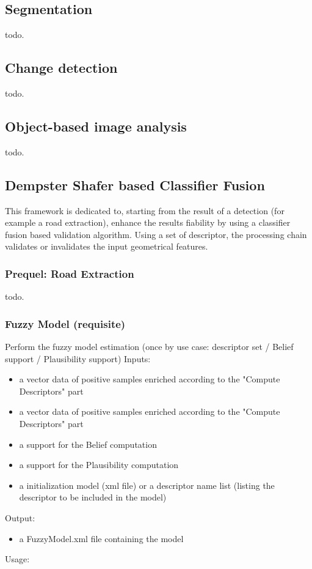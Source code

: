 \subsection{Segmentation}\label{ssec:segmentation}

todo.

\subsection{Change detection}\label{ssec:changedetection}

todo.

\subsection{Object-based image analysis}\label{ssec:obia}

todo.

\subsection{Dempster Shafer based Classifier Fusion}\label{ssec:classifierfusion}

This framework is dedicated to, starting from the result of a detection (for example a road extraction), enhance the results fiability by using a classifier fusion based validation algorithm. Using a set of descriptor, the processing chain validates or invalidates the input geometrical features.

\subsubsection{Prequel: Road Extraction}

todo.

\subsubsection{Fuzzy Model (requisite)}

Perform the fuzzy model estimation (once by use case: descriptor set / Belief support / Plausibility support)
Inputs:
\begin{itemize}
\item a vector data of positive samples enriched according to the "Compute Descriptors" part
\item a vector data of positive samples enriched according to the "Compute Descriptors" part
\item a support for the Belief computation
\item a support for the Plausibility computation
\item a initialization model (xml file) or a descriptor name list (listing the descriptor to be included in the model)
\end{itemize}
Output:
\begin{itemize}
\item a FuzzyModel.xml file containing the model
\end{itemize}
Usage:

